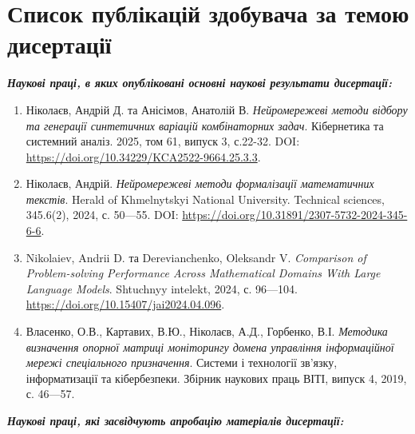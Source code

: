 \appendix

\chapter{Список публікацій здобувача за темою дисертації}
\vspace*{-1\baselineskip}
\textit{\textbf{Наукові праці, в яких опубліковані основні наукові результати дисертації:}}
\medskip

\begin{enumerate}
    \item Ніколаєв, Андрій Д. та Анісімов, Анатолій В. \textit{Нейромережеві методи відбору та генерації синтетичних варіацій комбінаторних задач}. Кібернетика та системний аналіз. 2025, том 61, випуск 3, с.22-32. DOI: \url{https://doi.org/10.34229/KCA2522-9664.25.3.3}.
    \item Ніколаєв, Андрій. \textit{Нейромережеві методи формалізації математичних текстів}. Herald of Khmelnytskyi National University. Technical sciences, 345.6(2), 2024, с. 50—55. DOI: \url{https://doi.org/10.31891/2307-5732-2024-345-6-6}.
    \item Nikolaiev, Andrii D. та Derevianchenko, Oleksandr V. \textit{Comparison of Problem-solving Performance Across Mathematical Domains With Large Language Models}. Shtuchnyy intelekt, 2024, с. 96—104. \url{https://doi.org/10.15407/jai2024.04.096}.
    \item Власенко, О.В., Картавих, В.Ю., Ніколаєв, А.Д., Горбенко, В.І. \textit{Методика визначення опорної матриці моніторингу домена управління інформаційної мережі спеціального призначення}. Системи і технології зв’язку, інформатизації та кібербезпеки. Збірник наукових праць ВІТІ, випуск 4, 2019, с. 46—57.
\end{enumerate}

\medskip
\textit{\textbf{Наукові праці, які засвідчують апробацію матеріалів дисертації:}}
\medskip

